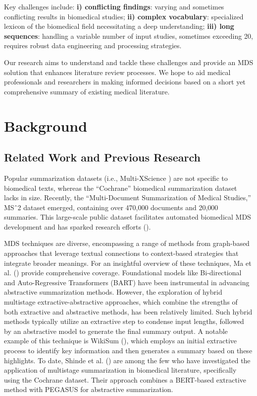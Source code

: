 \documentclass[11pt]{article}
\begin{document}
Key challenges include: \textbf{i) conflicting findings}: varying and sometimes conflicting results in biomedical studies; \textbf{ii) complex vocabulary}: specialized lexicon of the biomedical field necessitating a deep understanding; \textbf{iii) long sequences}: handling a variable number of input studies, sometimes exceeding 20, requires robust data engineering and processing strategies.

Our research aims to understand and tackle these challenges and provide an MDS solution that enhances literature review processes. We hope to aid medical professionals and researchers in making informed decisions based on a short yet comprehensive summary of existing medical literature.


\section{Background}

\subsection{Related Work and Previous Research}

Popular summarization datasets (i.e., Multi-XScience \cite{lu2020multixscience}) are not specific to biomedical texts, whereas the “Cochrane” biomedical summarization dataset \cite{wallace2020generating} lacks in size. Recently, the “Multi-Document Summarization of Medical Studies,” MSˆ2 dataset \cite{deyoung2021ms2} emerged, containing over 470,000 documents and 20,000 summaries. This large-scale public dataset facilitates automated biomedical MDS development and has sparked research efforts (\cite{otmakhova2022m3, tangsali2022abstractive, shinde-etal-2022-extractive}).

MDS techniques are diverse, encompassing a range of methods from graph-based approaches that leverage textual connections to context-based strategies that integrate broader meanings. For an insightful overview of these techniques, Ma et al. (\cite{ma2020multidocsum}) provide comprehensive coverage. Foundational models like Bi-directional and Auto-Regressive Transformers (BART) have been instrumental in advancing abstractive summarization methods. However, the exploration of hybrid multistage extractive-abstractive approaches, which combine the strengths of both extractive and abstractive methods, has been relatively limited. Such hybrid methods typically utilize an extractive step to condense input lengths, followed by an abstractive model to generate the final summary output. A notable example of this technique is WikiSum (\cite{liu2018generating}), which employs an initial extractive process to identify key information and then generates a summary based on these highlights. To date, Shinde et al. (\cite{shinde-etal-2022-extractive}) are among the few who have investigated the application of multistage summarization in biomedical literature, specifically using the Cochrane dataset. Their approach combines a BERT-based extractive method with PEGASUS for abstractive summarization.
\end{document}
